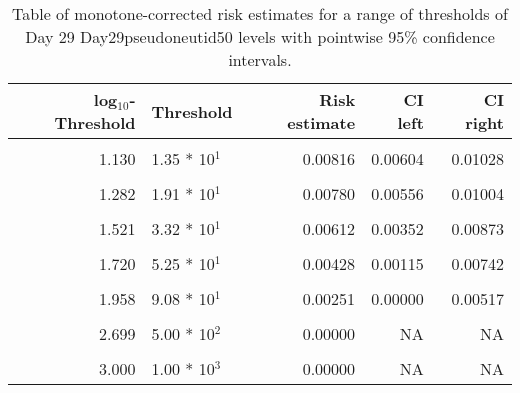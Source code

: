 \documentclass[]{article}
\begin{document}
\begin{table}[!h]

\caption{\label{tab:unnamed-chunk-23}Table of monotone-corrected risk estimates for a range of thresholds of Day 29 Day29pseudoneutid50 levels with pointwise 95\% confidence intervals.}
\centering
\begin{tabular}[t]{rlrrr}
\toprule
log$_{10}$-Threshold & Threshold & Risk estimate & CI left & CI right\\
\midrule
\cellcolor{gray!6}{0.083} & \cellcolor{gray!6}{1.21 * 10$^{0}$} & \cellcolor{gray!6}{0.00855} & \cellcolor{gray!6}{0.00654} & \cellcolor{gray!6}{0.01056}\\
1.130 & 1.35 * 10$^{1}$ & 0.00816 & 0.00604 & 0.01028\\
\cellcolor{gray!6}{1.204} & \cellcolor{gray!6}{1.60 * 10$^{1}$} & \cellcolor{gray!6}{0.00816} & \cellcolor{gray!6}{0.00601} & \cellcolor{gray!6}{0.01031}\\
1.282 & 1.91 * 10$^{1}$ & 0.00780 & 0.00556 & 0.01004\\
\cellcolor{gray!6}{1.423} & \cellcolor{gray!6}{2.65 * 10$^{1}$} & \cellcolor{gray!6}{0.00655} & \cellcolor{gray!6}{0.00439} & \cellcolor{gray!6}{0.00872}\\
1.521 & 3.32 * 10$^{1}$ & 0.00612 & 0.00352 & 0.00873\\
\cellcolor{gray!6}{1.613} & \cellcolor{gray!6}{4.10 * 10$^{1}$} & \cellcolor{gray!6}{0.00547} & \cellcolor{gray!6}{0.00251} & \cellcolor{gray!6}{0.00844}\\
1.720 & 5.25 * 10$^{1}$ & 0.00428 & 0.00115 & 0.00742\\
\cellcolor{gray!6}{1.891} & \cellcolor{gray!6}{7.78 * 10$^{1}$} & \cellcolor{gray!6}{0.00354} & \cellcolor{gray!6}{0.00006} & \cellcolor{gray!6}{0.00702}\\
1.958 & 9.08 * 10$^{1}$ & 0.00251 & 0.00000 & 0.00517\\
\cellcolor{gray!6}{2.047} & \cellcolor{gray!6}{1.11 * 10$^{2}$} & \cellcolor{gray!6}{0.00247} & \cellcolor{gray!6}{0.00039} & \cellcolor{gray!6}{0.00456}\\
2.699 & 5.00 * 10$^{2}$ & 0.00000 & NA & NA\\
\cellcolor{gray!6}{2.828} & \cellcolor{gray!6}{6.73 * 10$^{2}$} & \cellcolor{gray!6}{0.00000} & \cellcolor{gray!6}{NA} & \cellcolor{gray!6}{NA}\\
3.000 & 1.00 * 10$^{3}$ & 0.00000 & NA & NA\\
\bottomrule
\end{tabular}
\end{table}
\end{document}
